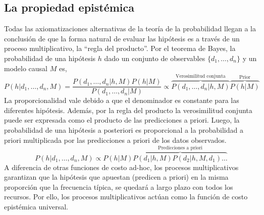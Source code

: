 \documentclass[a4paper,11pt]{book}
\theoremstyle{definition}
\begin{document}

\subsection{La propiedad epistémica}

%
Todas las axiomatizaciones alternativas de la teor\'ia de la probabilidad llegan a la conclusi\'on de que la forma natural de evaluar las hip\'otesis es a trav\'es de un proceso multiplicativo, la ``regla del producto''.
%
Por el teorema de Bayes, la probabilidad de una hip\'otesis $h$ dado un conjunto de observables $\{d_1, \dots, d_n \}$ y un modelo causal $M$ es,
%
\begin{equation}
P(h|d_1, \dots, d_n, M) = \frac{P(d_1, \dots, d_n|h, M) P(h|M)}{P(d_1, \dots, d_n| M)} \propto \overbrace{P(d_1, \dots, d_n|h, M)}^{\text{Verosimilitud conjunta}} \overbrace{P(h|M)}^{\text{Prior}}
\end{equation}
%
La proporcionalidad vale debido a que el denominador es constante para las diferentes hip\'otesis.
%
Además, por la regla del producto la verosimilitud conjunta puede ser expresada como el producto de las predicciones a priori.
%
Luego, la probabilidad de una hip\'otesis a posteriori es proporcional a la probabilidad a priori multiplicada por las predicciones a priori de los datos observados.
%
\begin{equation}
P(h|d_1, \dots, d_n, M) \propto P(h|M) \overbrace{P(d_1|h,M) P(d_2|h,M,d_1) \dots }^{\text{Predicciones a priori}}
\end{equation}
%
A diferencia de otras funciones de costo ad-hoc, los procesos multiplicativos garantizan que la hip\'otesis que apuestan (predicen a priori) en la misma proporci\'on que la frecuencia t\'ipica, se quedar\'a a largo plazo con todos los recursos.
%
Por ello, los procesos multiplicativos actúan como la funci\'on de costo epistémica universal.
\end{document}
